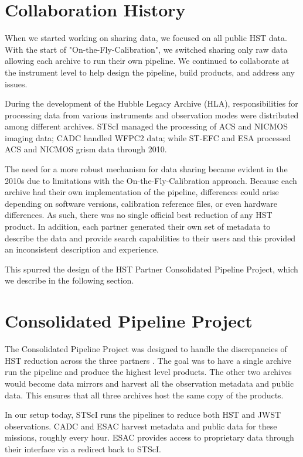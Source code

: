 \documentclass[11pt,twoside]{article}
\begin{document}
\section{Collaboration History}

When we started working on sharing data, we focused on all public HST data. 
With the start of "On-the-Fly-Calibration", we switched sharing only raw data allowing each archive to run their own pipeline. 
We continued to collaborate at the instrument level to help design the pipeline, build products, and address any issues.

During the development of the Hubble Legacy Archive (HLA), responsibilities for processing data from various instruments and observation modes were distributed among different archives. STScI managed the processing of ACS and NICMOS imaging data; CADC handled WFPC2 data; while ST-EFC and ESA processed ACS and NICMOS grism data through 2010. 

The need for a more robust mechanism for data sharing became evident in the 2010s due to limitations  with the On-the-Fly-Calibration approach. 
Because each archive had their own implementation of the pipeline, differences could arise depending on software versions, calibration reference files, or even hardware differences. 
As such, there was no single official best reduction of any HST product. 
In addition, each partner generated their own set of metadata to describe the data and provide search capabilities to their users and this provided an inconsistent description and experience.

This spurred the design of the HST Partner Consolidated Pipeline Project, which we describe in the following section.

\section{Consolidated Pipeline Project}

The Consolidated Pipeline Project was designed to handle the discrepancies of HST reduction across the three partners \citep{2019ASPC..523..425D}. 
The goal was to have a single archive run the pipeline and produce the highest level products. 
The other two archives would become data mirrors and harvest all the observation metadata and public data. 
This ensures that all three archives host the same copy of the products. 

In our setup today, STScI runs the pipelines to reduce both HST and JWST observations. 
CADC and ESAC harvest metadata and public data for these missions, roughly every hour. 
ESAC provides access to proprietary data through their interface via a redirect back to STScI.
\end{document}
